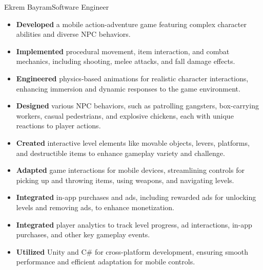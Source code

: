 \documentclass{article}
\begin{document}
\begin{cv}[avatar]{Ekrem Bayram}{Software Engineer}
    \cvseparator[2]
    \begin{cvevent}[2022]
        \begin{itemize}
            \item \textbf{Developed} a mobile action-adventure game featuring complex character abilities and diverse NPC behaviors.
            \item \textbf{Implemented} procedural movement, item interaction, and combat mechanics, including shooting, melee attacks, and fall damage effects.
            \item \textbf{Engineered} physics-based animations for realistic character interactions, enhancing immersion and dynamic responses to the game environment.
            \item \textbf{Designed} various NPC behaviors, such as patrolling gangsters, box-carrying workers, casual pedestrians, and explosive chickens, each with unique reactions to player actions.
            \item \textbf{Created} interactive level elements like movable objects, levers, platforms, and destructible items to enhance gameplay variety and challenge.
            \item \textbf{Adapted} game interactions for mobile devices, streamlining controls for picking up and throwing items, using weapons, and navigating levels.
            \item \textbf{Integrated} in-app purchases and ads, including rewarded ads for unlocking levels and removing ads, to enhance monetization.
            \item \textbf{Integrated} player analytics to track level progress, ad interactions, in-app purchases, and other key gameplay events.
            \item \textbf{Utilized} Unity and C\# for cross-platform development, ensuring smooth performance and efficient adaptation for mobile controls.
        \end{itemize}
    \end{cvevent}


\end{cv}
\end{document}
